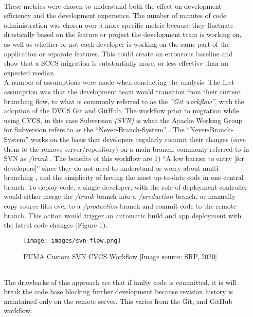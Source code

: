 \documentclass{article}
\begin{document}
{\\
\indent
These metrics were chosen to understand both the effect on development efficiency and the development experience. The number of minutes of code administration was chosen over a more specific metric because they fluctuate drastically based on the feature or project the development team is working on, as well as whether or not each developer is working on the same part of the application or separate features. This could create an erroneous baseline and show that a SCCS migration is substantially more, or less effective than an expected median.
\\
\indent
A number of assumptions were made when conducting the analysis. The first assumption was that the development team would transition from their current branching flow, to what is commonly referred to as the \textit{“Git workflow”}, with the adoption of the DVCS Git and GitHub. The workflow prior to migration while using CVCS, in this case Subversion \textit{(SVN)} is what the Apache Working Group for Subversion refers to as the “Never-Branch-System” \cite{software-best-practices}. The “Never-Branch-System” works on the basis that developers regularly commit their changes (save them to the remove server/repository) on a main branch, commonly referred to in SVN as \textit{/trunk} \cite{software-best-practices}. The benefits of this workflow are 1) “A low barrier to entry [for developers]” since they do not need to understand or worry about multi-branching \cite{software-best-practices}, and the simplicity of having the most up-to-date code in one central branch. To deploy code, a single developer, with the role of deployment controller would either merge the \textit{/trunk} branch into a \textit{/production} branch, or manually copy source files over to a \textit{/production} branch and commit code to the remote branch. This action would trigger an automatic build and app deployment with the latest code changes (Figure 1). 
\begin{figure}[h]
\centering
\texttt{[image: images/svn-flow.png]}
\caption{PUMA Custom SVN CVCS Workflow [Image source: SRP, 2020]}
\end{figure}
\\
\indent
The drawbacks of this approach are that if faulty code is committed, it is will break the code base blocking further development because revision history is maintained only on the remote server. This varies from the Git, and GitHub workflow.
\\
\indent
}
\end{document}
